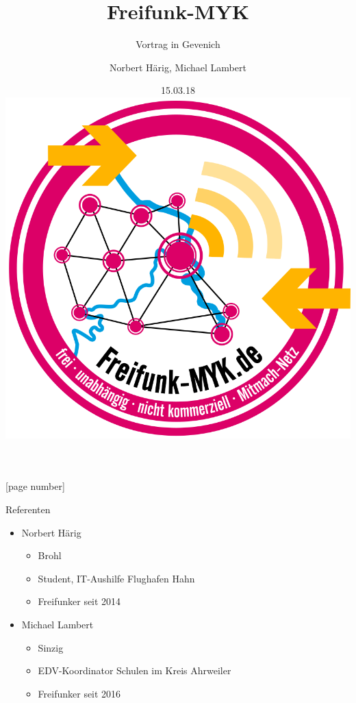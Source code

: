 \documentclass{beamer}
\begin{document}
\title[]{Freifunk-MYK}
\subtitle[Freifunk-MYK]{Vortrag in Gevenich}
\author[Freifunk-MYK]{Norbert Härig, Michael Lambert}
\date{15.03.18\\\vspace{0.5cm} \includegraphics[scale=0.1]{Bilder/Logo.png}}
\institute{}
[page number]

\begin{frame}
\titlepage	
\end{frame}
\begin{frame}{Referenten}
\begin{itemize}
	\item Norbert Härig
	\begin{itemize}
		\item Brohl
		\item Student, IT-Aushilfe Flughafen Hahn
		\item Freifunker seit 2014
	\end{itemize}
\end{itemize}
\begin{itemize}
	\item Michael Lambert
	\begin{itemize}
		\item Sinzig
		\item EDV-Koordinator Schulen im Kreis Ahrweiler
		\item Freifunker seit 2016
	\end{itemize}
\end{itemize}
\end{frame}
\end{document}
